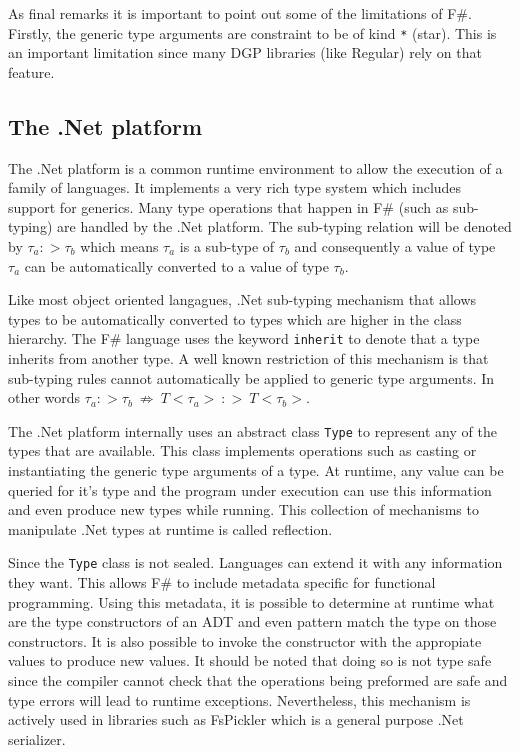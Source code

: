\documentclass{sigplanconf}
\begin{document}
As final remarks it is important to point out some of the limitations of F\#. Firstly, the generic type arguments are constraint to be of kind \verb+*+ (star). This is an important limitation since many DGP libraries (like Regular) rely on that feature.

\subsection{The .Net platform}
The .Net platform is a common runtime environment to allow the execution of a family of languages. It implements a very rich type system which includes support for generics. Many type operations that happen in F\# (such as sub-typing) are handled by the .Net platform. The sub-typing relation will be denoted by $\tau_a :> \tau_b$ which means $\tau_a$ is a sub-type of $\tau_b$ and consequently a value of type $\tau_a$ can be automatically converted to a value of type $\tau_b$.

Like most object oriented langagues, .Net sub-typing mechanism that allows types to be automatically converted to types which are higher in the class hierarchy. The F\# language uses the keyword \verb+inherit+ to denote that a type inherits from another type. A well known restriction of this mechanism is that sub-typing rules cannot automatically be applied to generic type arguments. In other words $\tau_a :> \tau_b\ \not\Rightarrow\ T<\tau_a> \ :> \ T<\tau_b>$.

The .Net platform internally uses an abstract class \verb+Type+ to represent any of the types that are available. This class implements operations such as casting or instantiating the generic type arguments of a type. At runtime, any value can be queried for it's type and the program under execution can use this information and even produce new types while running. This collection of mechanisms to manipulate .Net types at runtime is called reflection.

Since the \verb+Type+ class is not sealed. Languages can extend it with any information they want. This allows F\# to include metadata specific for functional programming. Using this metadata, it is possible to determine at runtime what are the type constructors of an ADT and even pattern match the type on those constructors. It is also possible to invoke the constructor with the appropiate values to produce new values. It should be noted that doing so is not type safe since the compiler cannot check that the operations being preformed are safe and type errors will lead to runtime exceptions. Nevertheless, this mechanism is actively used in libraries such as FsPickler \cite{FsPickler} which is a general purpose .Net serializer.
\end{document}
